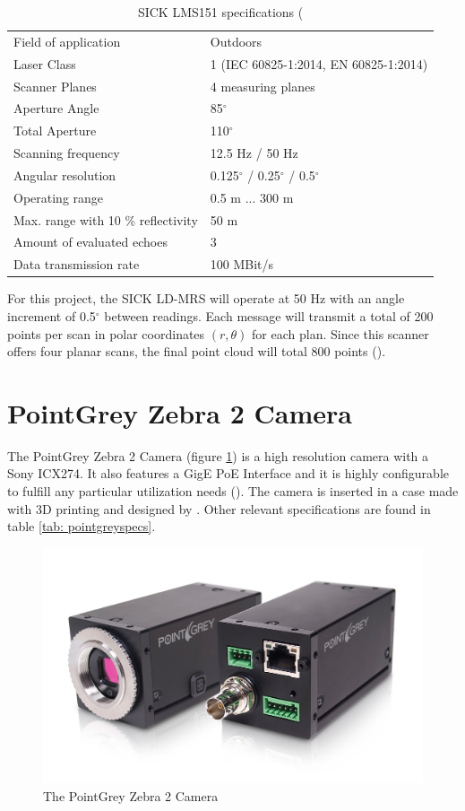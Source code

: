 \begin{table}[!h]
	\centering
	\caption{SICK LMS151 specifications (\cite{SICKa}}
	\label{tab: sickldmrsspecs}
	\begin{tabular}{ll}
		\hline
		Field of application & Outdoors\\
		Laser Class & 	1 (IEC 60825-1:2014, EN 60825-1:2014) \\
		Scanner Planes & 4 measuring planes \\
		Aperture Angle & 85$^{\circ}$  \\
		Total Aperture & 110$^{\circ}$\\
		Scanning frequency & 12.5 Hz / 50 Hz \\
		Angular resolution	& 0.125$^{\circ}$ / 0.25$^{\circ}$ / 0.5$^{\circ}$ \\
		Operating range	& 0.5 m ... 300 m \\
		Max. range with 10 \% reflectivity & 50 m \\
		Amount of evaluated echoes & 3 \\
		Data transmission rate & 100 MBit/s \\
		\hline
	\end{tabular}
\end{table}

For this project, the SICK LD-MRS will operate at 50 Hz with an angle increment of 0.5$^{\circ}$ between readings. Each message will transmit a total of 200 points per scan in polar coordinates $(r,\theta)$ for each plan. Since this scanner offers four planar scans, the final point cloud will total 800 points (\cite{SICKa}).

\section{PointGrey Zebra 2 Camera}

The PointGrey Zebra 2 Camera (figure \ref{fig:pointgrey}) is a high resolution camera with a Sony ICX274. It also features a GigE PoE Interface and it is highly configurable to fulfill any particular utilization needs (\cite{PointGrey}). The camera is inserted in a case made with 3D printing and designed by \cite{Correia2017}.  Other relevant specifications are found in table \ref{tab: pointgreyspecs}. 

\begin{figure}[htp]
	
	\centering
	\includegraphics[width=.6\textwidth]{capexp/imgs/pointgrey}
	
	\caption{The PointGrey Zebra 2 Camera}
	\label{fig:pointgrey}
	
\end{figure}

